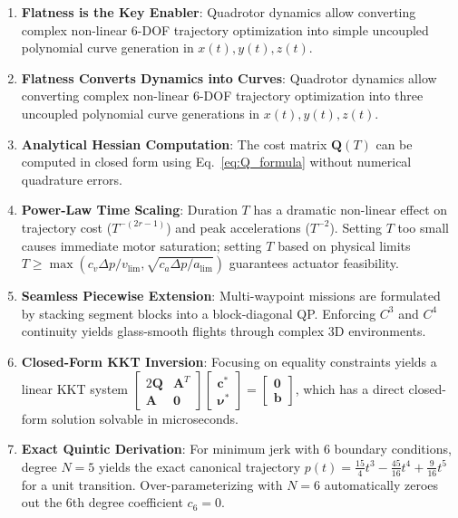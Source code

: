 \documentclass[11pt,a4paper]{article}
\begin{document}
\begin{examplebox}
\begin{enumerate}
    \item \textbf{Flatness is the Key Enabler}: Quadrotor dynamics allow converting complex non-linear 6-DOF trajectory optimization into simple uncoupled polynomial curve generation in $x(t), y(t), z(t)$.
    \item \textbf{Flatness Converts Dynamics into Curves}: Quadrotor dynamics allow converting complex non-linear 6-DOF trajectory optimization into three uncoupled polynomial curve generations in $x(t), y(t), z(t)$.
    \item \textbf{Analytical Hessian Computation}: The cost matrix $\mathbf{Q}(T)$ can be computed in closed form using Eq.~\eqref{eq:Q_formula} without numerical quadrature errors.
    \item \textbf{Power-Law Time Scaling}: Duration $T$ has a dramatic non-linear effect on trajectory cost ($T^{-(2r-1)}$) and peak accelerations ($T^{-2}$). Setting $T$ too small causes immediate motor saturation; setting $T$ based on physical limits $T \ge \max(c_v \Delta p / v_{\lim}, \sqrt{c_a \Delta p / a_{\lim}})$ guarantees actuator feasibility.
    \item \textbf{Seamless Piecewise Extension}: Multi-waypoint missions are formulated by stacking segment blocks into a block-diagonal QP. Enforcing $C^3$ and $C^4$ continuity yields glass-smooth flights through complex 3D environments.
    \item \textbf{Closed-Form KKT Inversion}: Focusing on equality constraints yields a linear KKT system $\begin{bmatrix} 2\mathbf{Q} & \mathbf{A}^T \\ \mathbf{A} & \mathbf{0} \end{bmatrix} \begin{bmatrix} \mathbf{c}^* \\ \boldsymbol{\nu}^* \end{bmatrix} = \begin{bmatrix} \mathbf{0} \\ \mathbf{b} \end{bmatrix}$, which has a direct closed-form solution solvable in microseconds.
    \item \textbf{Exact Quintic Derivation}: For minimum jerk with 6 boundary conditions, degree $N=5$ yields the exact canonical trajectory $p(t) = \frac{15}{4}t^3 - \frac{45}{16}t^4 + \frac{9}{16}t^5$ for a unit transition. Over-parameterizing with $N=6$ automatically zeroes out the 6th degree coefficient $c_6 = 0$.

\end{enumerate}
\end{examplebox}
\end{document}
